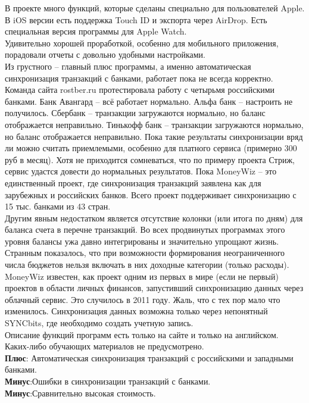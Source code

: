 В проекте много функций, которые сделаны специально для пользователей Apple. В iOS версии есть поддержка Touch ID и экспорта через AirDrop. Есть специальная версия программы для Apple Watch.\\

Удивительно хорошей проработкой, особенно для мобильного приложения, порадовали отчеты с довольно удобными настройками.\\

Из грустного – главный плюс программы, а именно автоматическая синхронизация транзакций с банками, работает пока не всегда корректно. Команда сайта rostber.ru протестировала работу с четырьмя российскими банками. Банк Авангард – всё работает нормально. Альфа банк – настроить не получилось. Сбербанк – транзакции загружаются нормально, но баланс отображается неправильно. Тинькофф банк – транзакции загружаются нормально, но баланс отображается неправильно. Пока такие результаты синхронизации вряд ли можно считать приемлемыми, особенно для платного сервиса (примерно 300 руб в месяц). Хотя не приходится сомневаться, что по примеру проекта Стриж, сервис удастся довести до нормальных результатов. Пока MoneyWiz – это единственный проект, где синхронизация транзакций заявлена как для зарубежных и российских банков. Всего проект поддерживает синхронизацию с 15 тыс. банками из 43 стран.\\

Другим явным недостатком является отсутствие колонки (или итога по дням) для баланса счета в перечне транзакций. Во всех продвинутых программах этого уровня балансы ужа давно интегрированы и значительно упрощают жизнь.\\

Странным показалось, что при возможности формирования неограниченного числа бюджетов нельзя включать в них доходные категории (только расходы).\\

MoneyWiz известен, как проект одним из первых в мире (если не первый) проектов в области личных финансов, запустивший синхронизацию данных через облачный сервис. Это случилось в 2011 году. Жаль, что с тех пор мало что изменилось. Синхронизация данных возможна только через непонятный SYNCbits, где необходимо создать учетную запись.\\

Описание функций программ есть только на сайте и только на английском. Каких-либо обучающих материалов не предусмотрено.\\

\textbf{Плюс}: Автоматическая синхронизация транзакций с российскими и западными банками.
\\
\textbf{Минус}:Ошибки в синхронизации транзакций с банками.\\
\textbf{Минус}:Сравнительно высокая стоимость.\\
\pagebreak



